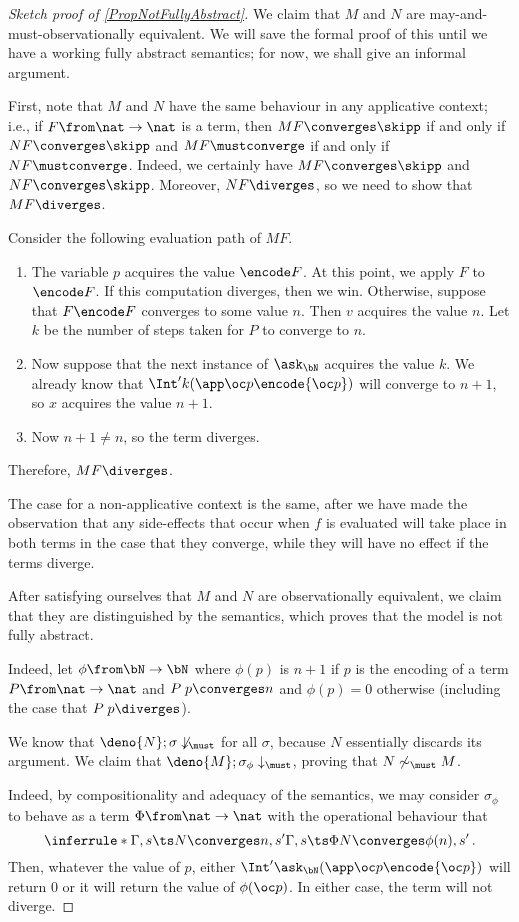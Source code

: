 \begin{proof}[Sketch proof of \ref{PropNotFullyAbstract}]
  We claim that $M$ and $N$ are may-and-must-observationally equivalent.  
  We will save the formal proof of this until we have a working fully abstract semantics; for now, we shall give an informal argument.  

  First, note that $M$ and $N$ have the same behaviour in any applicative context; i.e., if $F\from \nat \to \nat$ is a term, then $MF\converges \skipp$ if and only if $NF\converges\skipp$ and $MF\mustconverge$ if and only if $NF\mustconverge$.  
  Indeed, we certainly have $MF\converges\skipp$ and $NF\converges\skipp$.
  Moreover, $NF\diverges$, so we need to show that $MF\diverges$.

  Consider the following evaluation path of $MF$.
  \begin{enumerate}
    \item The variable $p$ acquires the value $\encode F$.  
      At this point, we apply $F$ to $\encode F$.  
      If this computation diverges, then we win.  
      Otherwise, suppose that $F\encode F$ converges to some value $n$.  
      Then $v$ acquires the value $n$.
      Let $k$ be the number of steps taken for $P$ to converge to $n$.
    \item Now suppose that the next instance of $\ask_\bN$ acquires the value $k$.  
      We already know that $\Int' k (\app \oc p \encode{\oc p})$ will converge to $n+1$, so $x$ acquires the value $n+1$.
    \item Now $n+1 \ne n$, so the term diverges.
  \end{enumerate}
  Therefore, $MF\diverges$.

  The case for a non-applicative context is the same, after we have made the observation that any side-effects that occur when $f$ is evaluated will take place in both terms in the case that they converge, while they will have no effect if the terms diverge.

  After satisfying ourselves that $M$ and $N$ are observationally equivalent, we claim that they are distinguished by the semantics, which proves that the model is not fully abstract.

  Indeed, let $\phi\from \bN \to \bN$ where $\phi(p)$ is $n+1$ if $p$ is the encoding of a term $P\from\nat \to \nat$ and $P\;p\converges n$ and $\phi(p)=0$ otherwise (including the case that $P\;p\diverges$).

  We know that $\deno{N};\sigma\not\downarrow_{\must}$ for all $\sigma$, because $N$ essentially discards its argument.
  We claim that $\deno{M};\sigma_\phi\downarrow_{\must}$, proving that $N\not\sim_{\must} M$.

  Indeed, by compositionality and adequacy of the semantics, we may consider $\sigma_\phi$ to behave as a term $\Phi\from\nat \to \nat$ with the operational behaviour that
  \[
    \inferrule*{\Gamma,s\ts N \converges n,s'}{\Gamma,s\ts \Phi N \converges \phi(n),s'}\,.
    \]
  Then, whatever the value of $p$, either $\Int' \ask_{\bN} (\app \oc p \encode{\oc p})$ will return $0$ or it will return the value of $\phi(\oc p)$.  
  In either case, the term will not diverge.
\end{proof}

